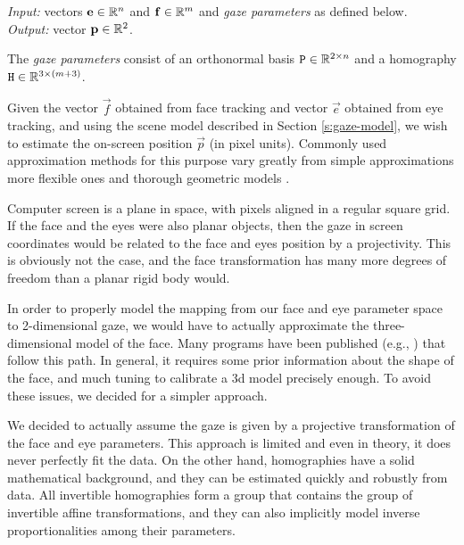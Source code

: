 \textit{Input:} vectors $\mathbf{e} \in \mathbb{R}^n$ and $\mathbf{f} \in \mathbb{R}^m$ and \textit{gaze parameters} as defined below.\\
\textit{Output:} vector $\mathbf{p} \in \mathbb{R}^2$.\\

\begin{definition} \label{d:gaze-parameters}
The \textit{gaze parameters} consist of an orthonormal basis $\mathtt{P} \in \mathbb{R}^{2\times n}$ and a homography $\mathtt{H} \in \mathbb{R}^{3 \times (m+3)}$.
\end{definition}

Given the vector $\vec f$ obtained from face tracking and vector $\vec e$ obtained from eye tracking, and using the scene model described in Section \ref{s:gaze-model}, we wish to estimate the on-screen position $\vec p$ (in pixel units).
Commonly used approximation methods for this purpose vary greatly from simple approximations \cite{zhu12} more flexible ones \cite{kassner14,yucel09} and thorough geometric models \cite{villanueva08,wang16}.

Computer screen is a plane in space, with pixels aligned in a regular square grid.
If the face and the eyes were also planar objects, then the gaze in screen coordinates would be related to the face and eyes position by a projectivity.
This is obviously not the case, and the face transformation has many more degrees of freedom than a planar rigid body would.
 
In order to properly model the mapping from our face and eye parameter space to 2-dimensional gaze, we would have to actually approximate the three-dimensional model of the face.
Many programs have been published (e.g., \cite{fanelli11}) that follow this path.
In general, it requires some prior information about the shape of the face, and much tuning to calibrate a 3d model precisely enough.
To avoid these issues, we decided for a simpler approach.

We decided to actually assume the gaze is given by a projective transformation of the face and eye parameters.
This approach is limited and even in theory, it does never perfectly fit the data.
On the other hand, homographies have a solid mathematical background, and they can be estimated quickly and robustly from data.
All invertible homographies form a group that contains the group of invertible affine transformations, and they can also implicitly model inverse proportionalities among their parameters.



